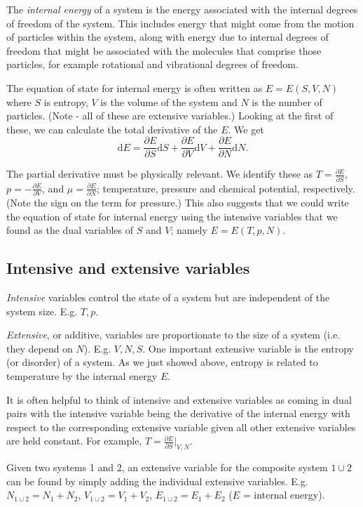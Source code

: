 The \emph{internal energy} of a system is the energy associated with the internal degrees of freedom of the system. This includes energy that might come from the motion of particles within the system, along with energy due to internal degrees of freedom that might be associated with the molecules that comprise those particles, for example rotational and vibrational degrees of freedom. 

The equation of state for internal energy is often written as $E = E(S,V,N)$ where $S$ is entropy, $V$ is the volume of the system and $N$ is the number of particles. (Note - all of these are extensive variables.)
Looking at the first of these, we can calculate the total derivative of the $E$. We get
$$
	\mathrm{d}E = \frac{\partial E}{\partial S}\mathrm{d}S +  \frac{\partial E}{\partial V}\mathrm{d}V +  \frac{\partial E}{\partial N}\mathrm{d}N.  
$$

The partial derivative must be physically relevant. We identify these as $T =  \frac{\partial E}{\partial S}$, $p = -\frac{\partial E}{\partial V}$, and $\mu = \frac{\partial E}{\partial N}$; temperature, pressure and chemical potential, respectively. (Note the sign on the term for pressure.) This also suggests that we could write the equation of state for internal energy using the intensive variables that we found as the dual variables of $S$ and $V$; namely $E = E(T,p,N)$.

\subsection{Intensive and extensive variables}

\emph{Intensive} variables control the state of a system but are independent of the system size. E.g. $T,p$.

\emph{Extensive}, or additive, variables are proportionate to the size of a system (i.e. they depend on $N$). E.g. $V,N,S$.
One important extensive variable is the entropy (or disorder) of a system. As we just showed above, entropy is related to temperature by the internal energy $E$.

It is often helpful to think of intensive and extensive variables as coming in dual pairs with the intensive variable being the derivative of the internal energy with respect to the corresponding extensive variable given all other extensive variables are held constant. For example, $T = \frac{\partial E}{\partial S}\vert_{V,N}$.

Given two systems 1 and 2, an extensive variable for the composite system $1\cup2$ can be found by simply adding the individual extensive variables. E.g. $N_{1\cup2} = N_1 + N_2$, $V_{1\cup2} = V_1 + V_2$, $E_{1\cup2} = E_1 + E_2$ ($E$ = internal energy).

